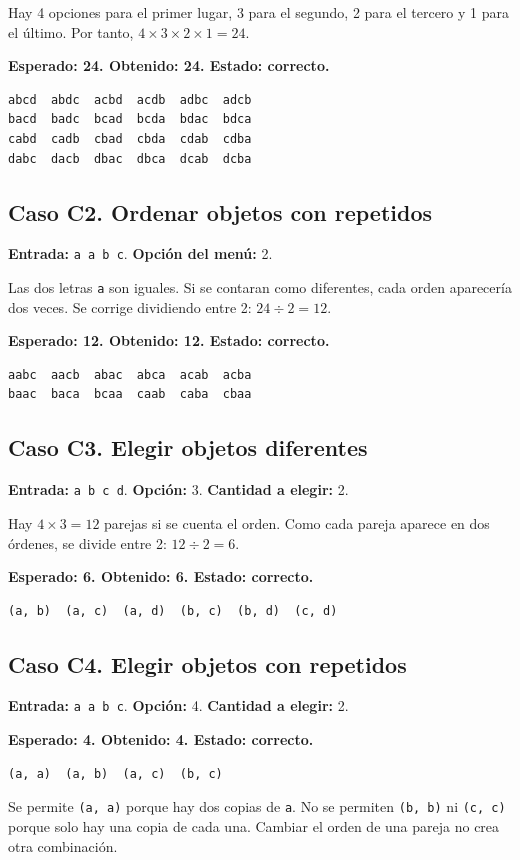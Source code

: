 \documentclass[11pt,a4paper]{article}
\begin{document}
Hay 4 opciones para el primer lugar, 3 para el segundo, 2 para el tercero y
1 para el último. Por tanto, $4\times3\times2\times1=24$.

\textbf{Esperado: 24. Obtenido: 24. Estado: correcto.}
\begin{verbatim}
abcd  abdc  acbd  acdb  adbc  adcb
bacd  badc  bcad  bcda  bdac  bdca
cabd  cadb  cbad  cbda  cdab  cdba
dabc  dacb  dbac  dbca  dcab  dcba
\end{verbatim}

\subsection*{Caso C2. Ordenar objetos con repetidos}
\textbf{Entrada:} \texttt{a a b c}. \textbf{Opción del menú:} 2.

Las dos letras \texttt{a} son iguales. Si se contaran como diferentes,
cada orden aparecería dos veces. Se corrige dividiendo entre 2:
$24\div2=12$.

\textbf{Esperado: 12. Obtenido: 12. Estado: correcto.}
\begin{verbatim}
aabc  aacb  abac  abca  acab  acba
baac  baca  bcaa  caab  caba  cbaa
\end{verbatim}

\subsection*{Caso C3. Elegir objetos diferentes}
\textbf{Entrada:} \texttt{a b c d}. \textbf{Opción:} 3.
\textbf{Cantidad a elegir:} 2.

Hay $4\times3=12$ parejas si se cuenta el orden. Como cada pareja aparece
en dos órdenes, se divide entre 2: $12\div2=6$.

\textbf{Esperado: 6. Obtenido: 6. Estado: correcto.}
\begin{verbatim}
(a, b)  (a, c)  (a, d)  (b, c)  (b, d)  (c, d)
\end{verbatim}

\subsection*{Caso C4. Elegir objetos con repetidos}
\textbf{Entrada:} \texttt{a a b c}. \textbf{Opción:} 4.
\textbf{Cantidad a elegir:} 2.

\textbf{Esperado: 4. Obtenido: 4. Estado: correcto.}
\begin{verbatim}
(a, a)  (a, b)  (a, c)  (b, c)
\end{verbatim}
Se permite \texttt{(a, a)} porque hay dos copias de \texttt{a}. No se
permiten \texttt{(b, b)} ni \texttt{(c, c)} porque solo hay una copia de
cada una. Cambiar el orden de una pareja no crea otra combinación.
\end{document}
